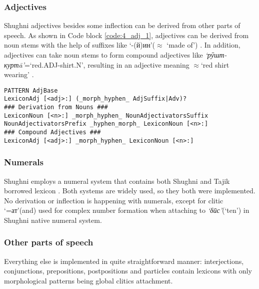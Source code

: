 \FloatBarrier

\subsubsection*{Adjectives}
Shughni adjectives besides some inflection can be derived from other parts of speech. As shown in Code block \ref{code:4_adj_1}, adjectives can be derived from noun stems with the help of suffixes like `-(й)ин'($\approx$ `made of') \parencite[169]{parker_shughni_2023}. In addition, adjectives can take noun stems to form compound adjectives like \textit{`рӯшт-куртā'}=`red.ADJ-shirt.N', resulting in an adjective meaning $\approx$`red shirt wearing' \parencite[173]{parker_shughni_2023}.

\begin{code_frame}[float,floatplacement=!h]
    \begin{footnotesize}\codespacing
    \begin{verbatim}
PATTERN AdjBase
LexiconAdj [<adj>:] (_morph_hyphen_ AdjSuffix|Adv)?
### Derivation from Nouns ###
LexiconNoun [<n>:] _morph_hyphen_ NounAdjectivatorsSuffix
NounAdjectivatorsPrefix _hyphen_morph_ LexiconNoun [<n>:]
### Compound Adjectives ###
LexiconAdj [<adj>:] _morph_hyphen_ LexiconNoun [<n>:]        
    \end{verbatim}
    \end{footnotesize}
    \tcblower
    \label{code:4_adj_1}
\end{code_frame}

\FloatBarrier

\subsubsection*{Numerals}
Shughni employs a numeral system that contains both Shughni and Tajik borrowed lexicon \parencite[176]{parker_shughni_2023}. Both systems are widely used, so they both were implemented. No derivation or inflection is happening with numerals, except for clitic `=ат'(and) used for complex number formation when attaching to \textit{`δӣс'}(`ten') in Shughni native numeral system.

\subsubsection*{Other parts of speech}
Everything else is implemented in quite straightforward manner: interjections, conjunctions, prepositions, postpositions and particles contain lexicons with only morphological patterns being global clitics attachment. 

\FloatBarrier

